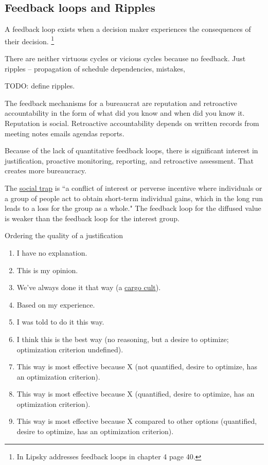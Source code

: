 \subsection*{Feedback loops and Ripples\label{sec:feedback-loop-and-ripples}}

A feedback loop exists when a decision maker experiences the consequences of their decision.
\footnote{In \cite{1983_Lipsky} Lipsky addresses feedback loops in chapter 4 page 40.}


There are neither virtuous cycles or vicious cycles because no feedback. Just ripples -- propagation of schedule dependencies, mistakes,

TODO: define ripples.

The feedback mechanisms for a bureaucrat are reputation and retroactive accountability in the form of what did you know and when did you know it.
Reputation is social.
Retroactive accountability depends on written records from meeting notes emails agendas reports.


Because of the lack of quantitative feedback loops, there is significant interest in justification, proactive monitoring, reporting, and retroactive assessment. That creates more bureaucracy.


The \href{https://en.wikipedia.org/wiki/Social_trap}{social trap} is ``a conflict of interest or perverse incentive where individuals or a group of people act to obtain short-term individual gains, which in the long run leads to a loss for the group as a whole."
The feedback loop for the diffused value is weaker than the feedback loop for the interest group. 


Ordering the quality of a justification
\begin{enumerate}
    \item I have no explanation.
    \item This is my opinion.
    \item We've always done it that way (a \href{https://en.wikipedia.org/wiki/Cargo_cult}{cargo cult}).
    \item Based on my experience.
    \item I was told to do it this way.
    \item I think this is the best way (no reasoning, but a desire to optimize; optimization criterion undefined).
    \item This way is most effective because X (not quantified, desire to optimize, has an optimization criterion).
    \item This way is most effective because X (quantified, desire to optimize, has an optimization criterion).
    \item This way is most effective because X compared to other options (quantified, desire to optimize, has an optimization criterion).
\end{enumerate}


